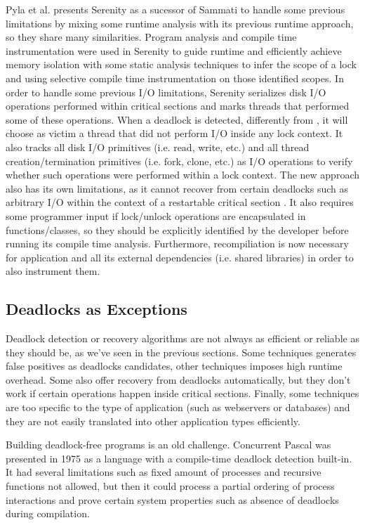 Pyla et al. presents Serenity \cite{serenity} as a sucessor of Sammati \cite{sammati} to handle some previous limitations by mixing some runtime analysis with
its previous runtime approach, so they share many similarities.
Program analysis and compile time instrumentation were used in Serenity to guide runtime and efficiently achieve memory isolation with
some static analysis techniques to infer the scope of a lock and using selective compile time instrumentation on those identified scopes.
In order to handle some previous I/O limitations, Serenity serializes disk I/O operations performed within critical sections and marks
threads that performed some of these operations.
When a deadlock is detected, differently from \cite{sammati}, it will choose as victim a thread that did not perform I/O inside any lock context.
It also tracks all disk I/O primitives (i.e. read, write, etc.) and all thread creation/termination primitives (i.e. fork, clone,
etc.) as I/O operations to verify whether such operations were performed within a lock context.
The new approach also has its own limitations, as it cannot recover from certain deadlocks such as arbitrary I/O within the context of a restartable critical section \cite{pyla}.
It also requires some programmer input if lock/unlock operations are encapsulated in functions/classes,
so they should be explicitly identified by the developer before running its compile time analysis.
Furthermore, recompiliation is now necessary for application and all its external dependencies (i.e. shared libraries) in order to also instrument them.

\subsection{Deadlocks as Exceptions}

Deadlock detection or recovery algorithms are not always as efficient or reliable as they should be, as we've seen in the previous sections.
Some techniques generates false positives as deadlocks candidates, other techniques imposes high runtime overhead. Some also offer recovery from
deadlocks automatically, but they don't work if certain operations happen inside critical sections. Finally, some techniques are too specific
to the type of application (such as webservers or databases) and they are not easily translated into other application types efficiently.

Building deadlock-free programs is an old challenge.
Concurrent Pascal  was presented in 1975 as a language with a compile-time deadlock detection built-in. It had several
limitations such as fixed amount of processes and recursive functions not allowed, but then it could process a partial ordering
of process interactions and prove certain system properties such as absence of deadlocks during compilation.

